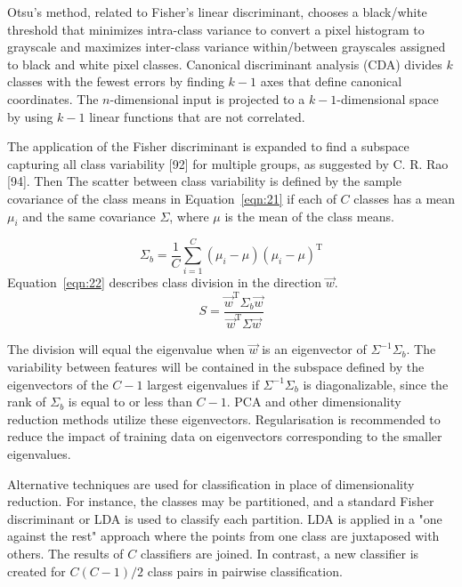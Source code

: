\documentclass[preprint,12pt]{elsarticle}
\begin{document}
Otsu's method, related to Fisher's linear discriminant, chooses a black/white threshold that minimizes intra-class variance to convert a pixel histogram to grayscale and maximizes inter-class variance within/between grayscales assigned to black and white pixel classes. Canonical discriminant analysis (CDA) divides $k$ classes with the fewest errors by finding $k - 1$ axes that define canonical coordinates. The $n$-dimensional input is projected to a $k - 1$-dimensional space by using $k - 1$ linear functions that are not correlated.

The application of the Fisher discriminant is expanded to find a subspace capturing all class variability [92] for multiple groups, as suggested by C. R. Rao [94]. Then The scatter between class variability is defined by the sample covariance of the class means in Equation~\ref{eqn:21} if each of $C$ classes has a mean $\mu_{i}$ and the same covariance  $\Sigma$, where $\mu$ is the mean of the class means.

\begin{equation}
	\Sigma_{b}={\frac{1}{C}}\sum_{i=1}^{C}\left(\mu_{i}-\mu\right)\left(\mu_{i}-\mu\right)^{\mathrm{T}}
	\label{eqn:21}
\end{equation}
Equation~\ref{eqn:22} describes class division in the direction $\vec{w}$.
\begin{equation}
	S={\frac{{\vec{w}}^{\mathrm{T}}\Sigma_{b}{\vec{w}}}{{\vec{w}}^{\mathrm{T}}\Sigma {\vec{w}}}}
	\label{eqn:22}
\end{equation}

The division will equal the eigenvalue when $\vec{w}$ is an eigenvector of $\Sigma ^{-1}\Sigma_{b}$. The variability between features will be contained in the subspace defined by the eigenvectors of the $C - 1$ largest eigenvalues if $\Sigma ^{-1}\Sigma_{b}$ is diagonalizable, since the rank of $\Sigma_{b}$ is equal to or less than $C - 1$. PCA and other dimensionality reduction methods utilize these eigenvectors. Regularisation is recommended to reduce the impact of training data on eigenvectors corresponding to the smaller eigenvalues.

Alternative techniques are used for classification in place of dimensionality reduction. For instance, the classes may be partitioned, and a standard Fisher discriminant or LDA is used to classify each partition. LDA is applied in a "one against the rest" approach where the points from one class are juxtaposed with others. The results of $C$ classifiers are joined. In contrast, a new classifier is created for $ C(C - 1)/2$ class pairs in pairwise classification.
\end{document}
